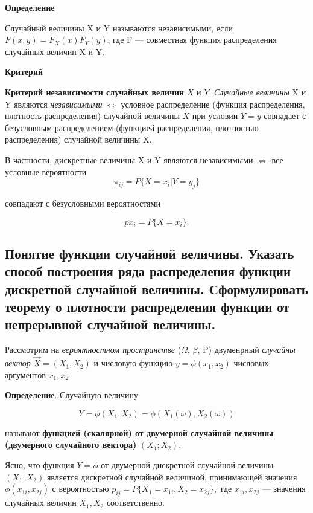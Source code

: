 \textbf{Определение}

Случайный величины X и Y называются независимыми, если $F(x, y) = F_X(x)F_Y(y)$, где F --- совместная функция распределения случайных величин X и Y.

\textbf{Критерий}

\textbf{Критерий независимости случайных величин} $X$ и $Y$. \textit{Случайные величины} X и Y являются \textit{независимыми} $\Leftrightarrow$ условное распределение (функция распределения,
плотность распределения) случайной величины $X$ при условии $Y = y$ совпадает с безусловным распределением (функцией распределения, плотностью распределения) случайной величины X.

В частности, дискретные величины X и Y являются независимыми $\Leftrightarrow$ все условные вероятности
\begin{equation}
	\pi_{ij} = P\{X = x_i |Y = y_j\}
\end{equation}

совпадают с безусловными вероятностями 

\begin{equation}
	px_i = P\{X = x_i\}.
\end{equation}


\subsection{Понятие функции случайной величины. Указать способ построения ряда распределения функции дискретной случайной величины. Сформулировать теорему о плотности распределения функции от непрерывной случайной величины.}

Рассмотрим на \textit{вероятностном пространстве} ($\Omega$, $\beta$, P) двуменрный \textit{случайны вектор} $\overrightarrow{X} = (X_1; X_2)$ и числовую функцию $y = \phi(x_1, x_2)$ числовых аргументов $x_1, x_2$

\textbf{Определение}. Случайную величину

\begin{equation}
	\label{stroganov-pidoras}
	Y = \phi(X_1, X_2) = \phi(X_1(\omega), X_2(\omega))
\end{equation}

называют \textbf{функцией (скалярной) от двумерной случайной величины (двумерного случайного вектора)} $(X_1;X_2)$.

Ясно, что функция $Y = \phi$ от двумерной дискретной случайной величины $(X_1;X_2)$ является дискретной случайной величиной, принимающей значения $\phi (x_{1i}, x_{2j})$ с вероятностью $p_{ij} = P\{X_1 = x_{1i}, X_2 = x_{2j}\}, $ где $x_{1i}, x_{2j}$ --- значения случайных величин $X_1, X_2$ соответственно.

